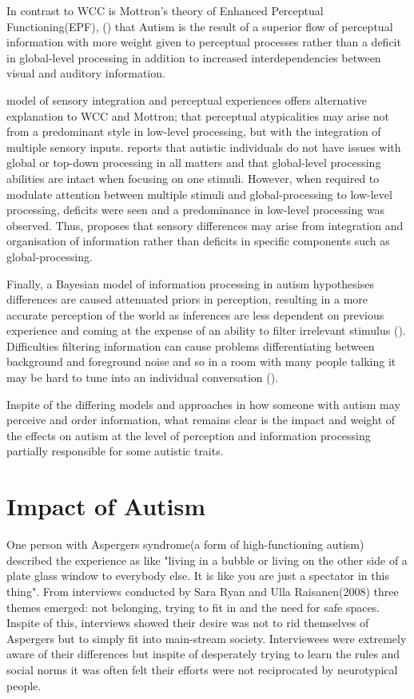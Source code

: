 \documentclass[11pt]{report}
\begin{document}
In contrast to WCC is Mottron's theory of Enhanced Perceptual Functioning(EPF), (\cite{mottron}) that Autism is the result of a superior flow of perceptual information with more weight given to perceptual processes rather than a deficit in global-level processing in addition to increased interdependencies between visual and auditory information. 

\cite{iaroc} model of sensory integration and perceptual experiences offers alternative explanation to WCC and Mottron; that perceptual atypicalities may arise not from a predominant style in low-level processing, but with the integration of multiple sensory inputs. \cite{iaroc} reports that autistic individuals do not have issues with global or top-down processing in all matters and that global-level processing abilities are intact when focusing on one stimuli. However, when required to modulate attention between multiple stimuli and global-processing to low-level processing, deficits were seen and a predominance in low-level processing was observed. Thus, \cite{iaroc} proposes that sensory differences may arise from integration and organisation of information rather than deficits in specific components such as global-processing.

Finally, a Bayesian model of information processing in autism hypothesises differences are caused attenuated priors in perception, resulting in a more accurate perception of the world as inferences are less dependent on previous experience and coming at the expense of an ability to filter irrelevant stimulus (\cite{bayes}). Difficulties filtering information can cause problems differentiating between background and foreground noise and so in a room with many people talking it may be hard to tune into an individual conversation (\cite{bayes}). 

Inspite of the differing models and approaches in how someone with autism may perceive and order information, what remains clear is the impact and weight of the effects on autism at the level of perception and information processing partially responsible for some autistic traits. 

\section{Impact of Autism}
One person with Aspergers syndrome(a form of high-functioning autism) described the experience as like "living in a bubble or living on the other side of a plate glass window to everybody else. It is like you are just a spectator in this thing"\cite{aspieway}. From interviews conducted by Sara Ryan and Ulla Raisanen(2008) three themes emerged: not belonging, trying to fit in and the need for safe spaces. Inspite of this, interviews showed their desire was not to rid themselves of Aspergers but to simply fit into main-stream society. Interviewees were extremely aware of their differences but inspite of desperately trying to learn the rules and social norms it was often felt their efforts were not reciprocated by neurotypical people.
\end{document}
